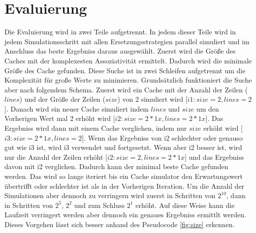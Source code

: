 \documentclass{scrreprt}
\begin{document}
\section{Evaluierung}
Die Evaluierung wird in zwei Teile aufgetrennt. In jedem dieser Teile wird in jedem Simulationsschritt mit allen Ersetzungsstrategien parallel simuliert und im Anschluss das beste Ergebniss daraus ausgewählt. \newline
Zuerst wird die Größe des Caches mit der komplexesten Assoziativität ermittelt. Dadurch wird die minimale Größe des Cache gefunden. Diese Suche ist in zwei Schleifen aufgetrennt um die Komplexität für große Werte zu minimieren. Grundsätzlich funktioniert die Suche aber nach folgendem Schema. Zuerst wird ein Cache mit der Anzahl der Zeilen (\(lines\)) und der Größe der Zeilen (\(size\)) von 2 simuliert wird [\(i1: {size = 2, lines = 2}\)]. Danach wird ein neuer Cache simuliert indem \(lines\) und \(size\) um den Vorherigen Wert mal 2 erhöht wird [\(i2: {size = 2*1x, lines = 2*1x}\)]. Das Ergebniss wird dann mit einem Cache verglichen, indem nur \(size\) erhöht wird [\(i3: {size = 2*1x, lines = 2}\)]. Wenn das Ergebniss von i2 schlechter oder genauso gut wie i3 ist, wird i3 verwendet und fortgesetzt. Wenn aber i2 besser ist, wird nur die Anzahl der Zeilen erhöht [\(i2: {size = 2, lines = 2*1x}\)] und das Ergebniss davon mit i2 verglichen. Dadurch kann der minimal beste Cache gefunden werden.\newline
Das wird so lange iteriert bis ein Cache simulator den Erwartungswert übertrifft oder schlechter ist als in der Vorherigen Iteration. Um die Anzahl der Simulationen aber dennoch zu verringern wird zuerst in Schritten von \(2^{10}\), dann in Schritten von \(2^{5}\), \(2^{2}\) und zum Schluss \(2^{1}\) erhöht. Auf diese Weise kann die Laufzeit verringert werden aber dennoch ein genaues Ergebniss ermittlt werden.\newline
Dieses Vorgehen lässt sich besser anhand des Pseudocode \cref{fig:size} erkennen.
\end{document}
